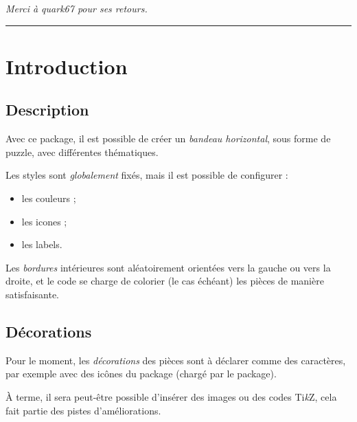 \documentclass[11pt,a4paper]{ltxdoc}
\providecommand\tikzlogo{Ti\textit{k}Z}
\let\TikZ\tikzlogo
\begin{document}
\hfill{\footnotesize\itshape Merci à quark67 pour ses retours.}

\vspace*{5mm}

\pagebreak


\hypertarget{matoc}{}

\tableofcontents

\vspace*{5mm}

\hrule

\vspace*{5mm}

\section{Introduction}

\subsection{Description}

Avec ce package, il est possible de créer un \textit{bandeau horizontal}, sous forme de puzzle, avec différentes thématiques.

Les styles sont \textit{globalement} fixés, mais il est possible de configurer :

\begin{itemize}
	\item les couleurs ;
	\item les icones ;
	\item les labels.
\end{itemize}

Les \textit{bordures} intérieures sont aléatoirement orientées vers la gauche ou vers la droite, et le code se charge de colorier (le cas échéant) les pièces de manière satisfaisante.

\subsection{Décorations}

Pour le moment, les \textit{décorations} des pièces sont à déclarer comme des caractères, par exemple avec des icônes du package  (chargé par le package).

\smallskip

À terme, il sera peut-être possible d'insérer des images ou des codes \TikZ, cela fait partie des pistes d'améliorations.
\end{document}
